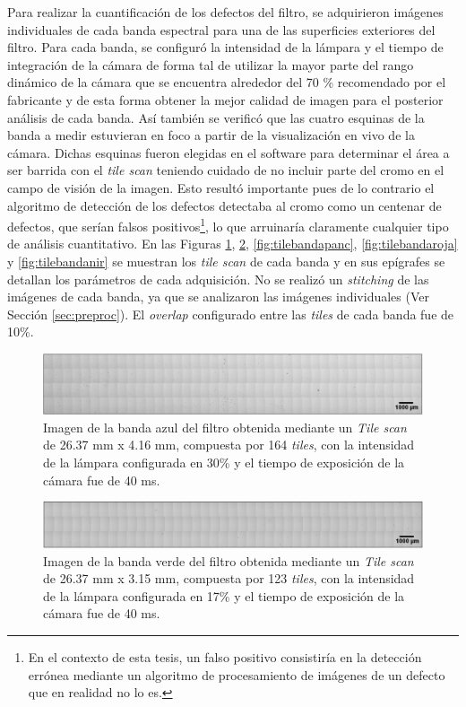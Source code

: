 \hspace{0.5cm}Para realizar la cuantificación de los defectos del filtro, se adquirieron imágenes individuales de cada banda espectral para una de las superficies exteriores del filtro. Para cada banda, se configuró la intensidad de la lámpara y el tiempo de integración de la cámara de forma tal de utilizar la mayor parte del rango dinámico de la cámara que se encuentra alrededor del 70 \% recomendado por el fabricante y de esta forma obtener la mejor calidad de imagen para el posterior análisis de cada banda. Así también se verificó que las cuatro esquinas de la banda a medir estuvieran en foco a partir de la visualización en vivo de la cámara. Dichas esquinas fueron elegidas en el software para determinar el área a ser barrida con el \textit{tile scan} teniendo cuidado de no incluir parte del cromo en el campo de visión de la imagen. Esto resultó importante pues de lo contrario el algoritmo de detección de los defectos detectaba al cromo como un centenar de defectos, que serían falsos positivos\footnote{En el contexto de esta tesis, un falso positivo consistiría en la detección errónea mediante un algoritmo de procesamiento de imágenes de un defecto que en realidad no lo es.}, lo que arruinaría claramente cualquier tipo de análisis cuantitativo. En las Figuras \ref{fig:tilebandaazul}, \ref{fig:tilebandaverde}, \ref{fig:tilebandapanc}, \ref{fig:tilebandaroja} y \ref{fig:tilebandanir} se muestran los \textit{tile scan} de cada banda y en sus epígrafes se detallan los parámetros de cada adquisición. No se realizó un \textit{stitching} de las imágenes de cada banda, ya que se analizaron las imágenes individuales (Ver Sección \ref{sec:preproc}). El \textit{overlap} configurado entre las \textit{tiles} de cada banda fue de 10\%.
\begin{figure}[H]
	\centering
	\includegraphics[width=1.0\textwidth]{Figs/cuantificaciondefectos/banda_AZUL.png}
	\caption{Imagen de la banda azul del filtro obtenida mediante un \textit{Tile scan} de 26.37 mm x 4.16 mm, compuesta por 164 \textit{tiles}, con la intensidad de la lámpara configurada en 30\% y el tiempo de exposición de la cámara fue de 40 ms.}
	\label{fig:tilebandaazul}
\end{figure}
\begin{figure}[H]
	\centering
	\includegraphics[width=1.0\textwidth]{Figs/cuantificaciondefectos/banda_VERDE.png}
	\caption{Imagen de la banda verde del filtro obtenida mediante un \textit{Tile scan} de 26.37 mm x 3.15 mm, compuesta por 123 \textit{tiles}, con la intensidad de la lámpara configurada en 17\% y el tiempo de exposición de la cámara fue de 40 ms.}
	\label{fig:tilebandaverde}
\end{figure}
